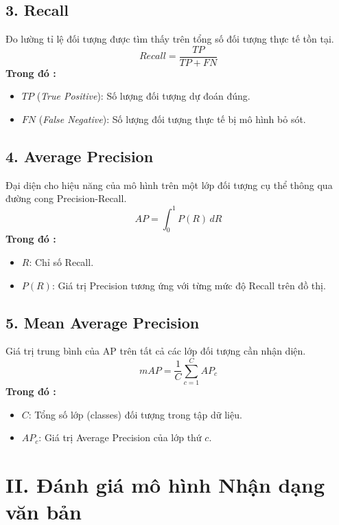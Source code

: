 \subsection*{3. Recall}
Đo lường tỉ lệ đối tượng được tìm thấy trên tổng số đối tượng thực tế tồn tại.
\begin{equation}
Recall = \frac{TP}{TP + FN}
\end{equation}
\textbf{Trong đó :}
\begin{itemize}
    \item $TP$ (\textit{True Positive}): Số lượng đối tượng dự đoán đúng.
    \item $FN$ (\textit{False Negative}): Số lượng đối tượng thực tế bị mô hình bỏ sót.
\end{itemize}

\subsection*{4. Average Precision}
Đại diện cho hiệu năng của mô hình trên một lớp đối tượng cụ thể thông qua đường cong Precision-Recall.
\begin{equation}
AP = \int_0^1 P(R)\, dR
\end{equation}
\textbf{Trong đó :}
\begin{itemize}
    \item $R$: Chỉ số Recall.
    \item $P(R)$: Giá trị Precision tương ứng với từng mức độ Recall trên đồ thị.
\end{itemize}

\subsection*{5. Mean Average Precision}
Giá trị trung bình của AP trên tất cả các lớp đối tượng cần nhận diện.
\begin{equation}
mAP = \frac{1}{C} \sum_{c=1}^{C} AP_c
\end{equation}
\textbf{Trong đó :}
\begin{itemize}
    \item $C$: Tổng số lớp (classes) đối tượng trong tập dữ liệu.
    \item $AP_c$: Giá trị Average Precision của lớp thứ $c$.
\end{itemize}

\section*{II. Đánh giá mô hình Nhận dạng văn bản}

